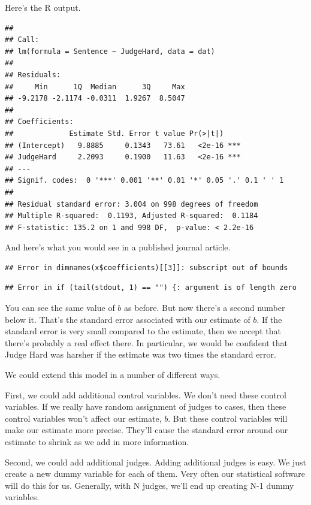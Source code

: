 \documentclass[12pt,twoside]{article}
\begin{document}
Here's the R output.

\begin{verbatim}
## 
## Call:
## lm(formula = Sentence ~ JudgeHard, data = dat)
## 
## Residuals:
##     Min      1Q  Median      3Q     Max 
## -9.2178 -2.1174 -0.0311  1.9267  8.5047 
## 
## Coefficients:
##             Estimate Std. Error t value Pr(>|t|)    
## (Intercept)   9.8885     0.1343   73.61   <2e-16 ***
## JudgeHard     2.2093     0.1900   11.63   <2e-16 ***
## ---
## Signif. codes:  0 '***' 0.001 '**' 0.01 '*' 0.05 '.' 0.1 ' ' 1
## 
## Residual standard error: 3.004 on 998 degrees of freedom
## Multiple R-squared:  0.1193, Adjusted R-squared:  0.1184 
## F-statistic: 135.2 on 1 and 998 DF,  p-value: < 2.2e-16
\end{verbatim}

And here's what you would see in a published journal article.

\begin{verbatim}
## Error in dimnames(x$coefficients)[[3]]: subscript out of bounds
\end{verbatim}

\begin{verbatim}
## Error in if (tail(stdout, 1) == "") {: argument is of length zero
\end{verbatim}

You can see the same value of \(b\) as before. But now there's a second
number below it. That's the standard error associated with our estimate
of \(b\). If the standard error is very small compared to the estimate,
then we accept that there's probably a real effect there. In particular,
we would be confident that Judge Hard was harsher if the estimate was
two times the standard error.

We could extend this model in a number of different ways.

First, we could add additional control variables. We don't need these
control variables. If we really have random assignment of judges to
cases, then these control variables won't affect our estimate, \(b\).
But these control variables will make our estimate more precise. They'll
cause the standard error around our estimate to shrink as we add in more
information.

Second, we could add additional judges. Adding additional judges is
easy. We just create a new dummy variable for each of them. Very often
our statistical software will do this for us. Generally, with N judges,
we'll end up creating N-1 dummy variables.
\end{document}
